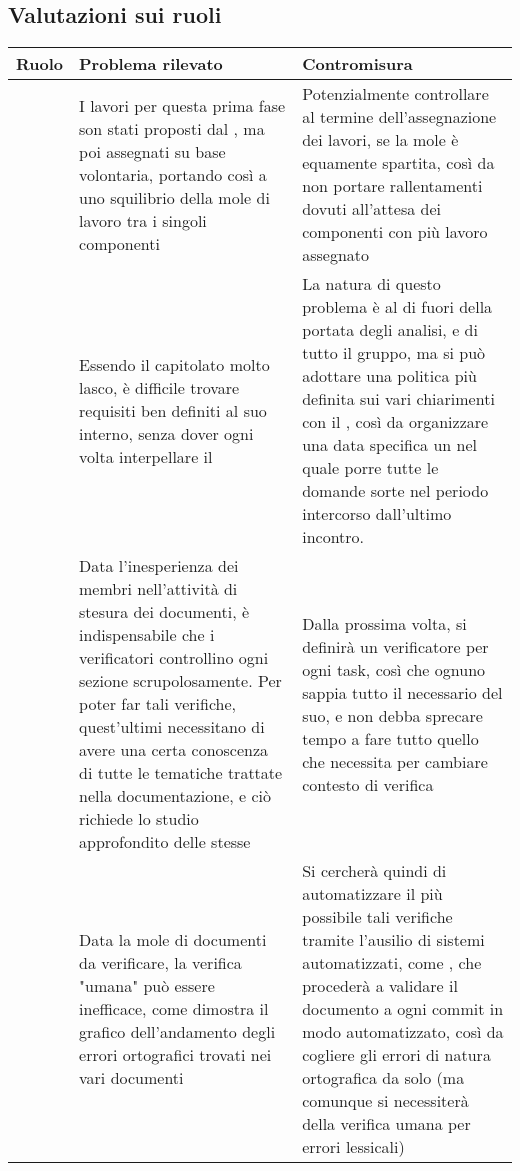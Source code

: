 	\subsection{Valutazioni sui ruoli}
		\begin{center}
			\begin{longtable}{|p{3cm}|p{6cm}|p{6cm}|}
			\hline
			\rowcolor{lighter-grayer}
			\textbf{Ruolo} & \textbf{Problema rilevato} & \textbf{Contromisura}\\
			\hline
			\endfirsthead
			\hline
			\glock{Responsabile}
			 &
			I lavori per questa prima fase son stati proposti dal \glock{responsabile}, ma poi assegnati su base volontaria, portando così a uno squilibrio della mole di lavoro tra i singoli componenti
			 &
			Potenzialmente controllare al termine dell'assegnazione dei lavori, se la mole è equamente spartita, così da non portare rallentamenti dovuti all'attesa dei componenti con più lavoro assegnato \\
			\hline
		
			\glock{Analista}
			 &
			Essendo il capitolato molto lasco, è difficile trovare requisiti ben definiti al suo interno, senza dover ogni volta interpellare il \glock{proponente}
	 		&
			La natura di questo problema è al di fuori della portata degli analisi, e di tutto il gruppo, ma si può adottare una politica più definita sui vari chiarimenti con il \glock{proponente}, così da organizzare una data specifica un \glock{meeting} nel quale porre tutte le domande sorte nel periodo intercorso dall'ultimo incontro. \\
			\hline

			\glock{Verificatori}
	 		&
			Data l'inesperienza dei membri nell'attività di stesura dei documenti, è indispensabile che i verificatori controllino ogni sezione scrupolosamente. Per poter far tali verifiche, quest'ultimi necessitano di avere una certa conoscenza di tutte le tematiche trattate nella documentazione, e ciò richiede lo studio approfondito delle stesse
	 		&
			Dalla prossima volta, si definirà un verificatore per ogni task, così che ognuno sappia tutto il necessario del suo, e non debba sprecare tempo a fare tutto quello che necessita per cambiare contesto di verifica \\
			\hline
			\glock{Verificatori}
	 		&
			Data la mole di documenti da verificare, la verifica "umana" può essere inefficace, come dimostra il grafico dell'andamento degli errori ortografici trovati nei vari documenti
	 		&
			Si cercherà quindi di automatizzare il più possibile tali verifiche tramite l'ausilio di sistemi automatizzati, come \glock{Github Actions}, che procederà a validare il documento a ogni commit in modo automatizzato, così da cogliere gli errori di natura ortografica da solo (ma comunque si necessiterà della verifica umana per errori lessicali) \\
			\hline


\end{longtable}
\end{center}
